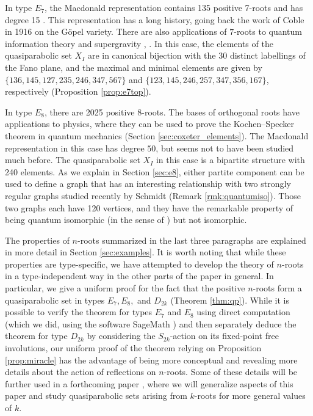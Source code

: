 \documentclass[11pt]{amsart}
\theoremstyle{plain}
\theoremstyle{definition}
\theoremstyle{remark}
\numberwithin{equation}{subsection}
\begin{document}
In type $E_7$, the Macdonald representation contains 135 positive 7-roots and
has degree 15 \cite[Proposition 4.12]{colombo10}. This representation has a long
history, going back the work of Coble in 1916 \cite[(65)]{coble1916} on the
G\"opel variety. There are also applications of $7$-roots to quantum information
theory and supergravity \cite[Section IV G]{cerchiai10}, \cite{duff07}. In this
case, the elements of the quasiparabolic set $X_I$ are in canonical bijection
with the 30 distinct labellings of the Fano plane, and the maximal and minimal
elements are given by $\{136, 145, 127, 235, 246, 347, 567\}$ and $\{123, 145,
246, 257, 347, 356, 167\}$, respectively (Proposition \ref{prop:e7top}).

In type $E_8$, there are 2025 positive $8$-roots. The bases of orthogonal roots
have applications to physics, where they can be used to prove the
Kochen--Specker theorem in quantum mechanics \cite{waegell15} (Section
\ref{sec:coxeter_elements}).  The Macdonald representation in this case has
degree $50$, but seems not to have been studied much before. The quasiparabolic
set $X_I$ in this case is a bipartite structure with 240 elements. As we explain
in Section \ref{sec:e8}, either partite component can be used to define a graph
that has an interesting relationship with two
strongly regular graphs studied recently by Schmidt \cite{schmidt24} (Remark
\ref{rmk:quantumiso}). Those two
graphs each have 120 vertices, and they have the remarkable property of being
quantum isomorphic (in the sense of \cite{atserias19}) but not isomorphic.

The properties of $n$-roots summarized in the last three paragraphs are
explained in more detail in Section \ref{sec:examples}. It is worth noting that
while these properties are type-specific, we have attempted to develop the
theory of $n$-roots in a type-independent way in the other parts of the paper in
general. In particular, we give a uniform proof for the fact that 
the positive $n$-roots form a quasiparabolic set in types $E_7, E_8,$ and $D_{2k}$ (Theorem \ref{thm:qp}).
While it is possible to
verify the theorem for types $E_7$ and $E_8$ using direct computation (which we
did, using the software SageMath \cite{sagemath}) and then separately deduce the
theorem for type $D_{2k}$ by considering the $S_{2k}$-action on its fixed-point
free involutions, our uniform proof of the theorem relying on Proposition
\ref{prop:miracle} has the advantage of being more conceptual and revealing more
details about the action of reflections on $n$-roots. Some of these details will
be further used in a forthcoming paper \cite{gx6}, where we will generalize
aspects of this paper and study quasiparabolic sets arising from $k$-roots for
more general values of $k$.
\end{document}
